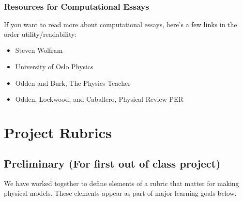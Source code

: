 \documentclass[letterpaper,10pt,english]{jupyterBook}
\begin{document}
\subsubsection{Resources for Computational Essays}
\label{\detokenize{content/0_course/assessments:resources-for-computational-essays}}
\sphinxAtStartPar
If you want to read more about computational essays, here’s a few links in the order utility/readability:
\begin{itemize}
\item {} 
\sphinxAtStartPar
Steven Wolfram \sphinxhyphen{} 

\item {} 
\sphinxAtStartPar
University of Oslo Physics \sphinxhyphen{} 

\item {} 
\sphinxAtStartPar
Odden and Burk, The Physics Teacher \sphinxhyphen{} 

\item {} 
\sphinxAtStartPar
Odden, Lockwood, and Caballero, Physical Review PER \sphinxhyphen{} 

\end{itemize}

\sphinxstepscope


\section{Project Rubrics}
\label{\detokenize{content/0_course/rubric:project-rubrics}}\label{\detokenize{content/0_course/rubric::doc}}

\subsection{Preliminary (For first out of class project)}
\label{\detokenize{content/0_course/rubric:preliminary-for-first-out-of-class-project}}
\sphinxAtStartPar
We have worked together to define elements of a rubric that matter for making physical models. These elements appear as part of major learning goals below.
\end{document}
